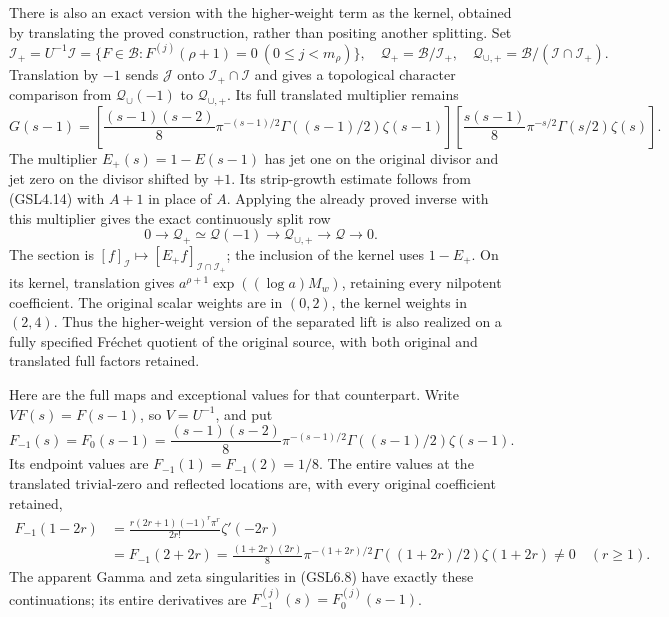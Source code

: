 There is also an exact version with the higher-weight term as the
kernel, obtained by translating the proved construction, rather than
positing another splitting. Set \[
\mathcal I_+=U^{-1}\mathcal I
 =\{F\in\mathcal B:F^{(j)}(\rho+1)=0\ (0\le j<m_\rho)\},
\quad\mathcal Q_+=\mathcal B/\mathcal I_+,
\quad\mathcal Q_{\cup,+}=\mathcal B/(\mathcal I\cap\mathcal I_+).
\tag{GSL6.5}
\] Translation by \(-1\) sends \(\mathcal J\) onto
\(\mathcal I_+\cap\mathcal I\) and gives a topological character
comparison from \(\mathcal Q_{\cup}(-1)\) to \(\mathcal Q_{\cup,+}\).
Its full translated multiplier remains \[
G(s-1)=
\left[\frac{(s-1)(s-2)}8\pi^{-(s-1)/2}
 \Gamma((s-1)/2)\zeta(s-1)\right]
\left[\frac{s(s-1)}8\pi^{-s/2}\Gamma(s/2)\zeta(s)\right].
\tag{GSL6.6}
\] The multiplier \(E_+(s)=1-E(s-1)\) has jet one on the original
divisor and jet zero on the divisor shifted by \(+1\). Its strip-growth
estimate follows from (GSL4.14) with \(A+1\) in place of \(A\). Applying
the already proved inverse with this multiplier gives the exact
continuously split row \[
0\longrightarrow\mathcal Q_+\simeq\mathcal Q(-1)
 \longrightarrow\mathcal Q_{\cup,+}
 \longrightarrow\mathcal Q\longrightarrow0.
\tag{GSL6.7}
\] The section is
\([f]_{\mathcal I}\mapsto[E_+f]_{\mathcal I\cap\mathcal I_+}\); the
inclusion of the kernel uses \(1-E_+\). On its kernel, translation gives
\(a^{\rho+1}\exp((\log a)M_w)\), retaining every nilpotent coefficient.
The original scalar weights are in \((0,2)\), the kernel weights in
\((2,4)\). Thus the higher-weight version of the separated lift is also
realized on a fully specified Fréchet quotient of the original source,
with both original and translated full factors retained.

Here are the full maps and exceptional values for that counterpart.
Write \(VF(s)=F(s-1)\), so \(V=U^{-1}\), and put \[
F_{-1}(s)=F_0(s-1)
 =\frac{(s-1)(s-2)}8\pi^{-(s-1)/2}
       \Gamma((s-1)/2)\zeta(s-1).
\tag{GSL6.8}
\] Its endpoint values are \(F_{-1}(1)=F_{-1}(2)=1/8\). The entire
values at the translated trivial-zero and reflected locations are, with
every original coefficient retained, \[
\begin{aligned}
F_{-1}(1-2r)
 &=\frac{r(2r+1)(-1)^r\pi^r}{2r!}\zeta'(-2r)\\
 &=F_{-1}(2+2r)
 =\frac{(1+2r)(2r)}8\pi^{-(1+2r)/2}
 \Gamma((1+2r)/2)\zeta(1+2r)\ne0\quad(r\ge1).
\end{aligned}
\tag{GSL6.9}
\] The apparent Gamma and zeta singularities in (GSL6.8) have exactly
these continuations; its entire derivatives are
\(F_{-1}^{(j)}(s)=F_0^{(j)}(s-1)\).

